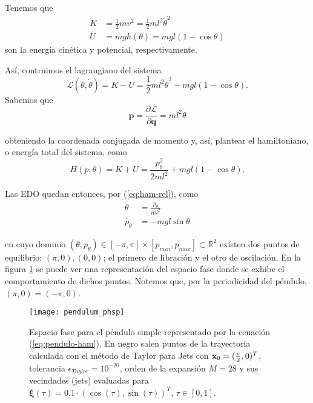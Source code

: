 Tenemos que 
\begin{align}
 K &= \frac{1}{2}m v^2 = \frac{1}{2} m l^2 \dot{\theta}^2 \nonumber \\
 U &= mgh(\theta) = mgl\left(1 - \cos{\theta} \right)
\end{align}
son la energía cinética y potencial, respectivamente. 

Así, contruimos el lagrangiano del sistema
\begin{equation*}
 \mathcal{L}(\theta,\dot{\theta}) = K - U = \frac{1}{2} m l^2 \dot{\theta}^2 - mgl\left(1 - \cos{\theta} \right).
\end{equation*}
Sabemos que
\begin{equation*}
 \mathbf{p} = \frac{\partial \mathcal{L}}{\partial \mathbf{\dot{q}}} = ml^2\dot{\theta}
\end{equation*}

obteniendo la coordenada conjugada de momento y, así, plantear el hamiltoniano, o energía total del sistema, como
\begin{equation}
 H(p,\theta) = K + U = \frac{p_{\theta}^2}{2ml^2} + mgl\left(1 - \cos{\theta} \right).
\label{eq:pendulo-ham}
\end{equation}
 
Las EDO quedan entonces, por (\ref{eq:ham-rel}), como
\begin{align}
 \dot{\theta} &= \frac{p_{\theta}}{ml^2} \nonumber \\
 \dot{p_{\theta}} &= -mgl\sin{\theta} 
\label{eq:pendulo-ode}
\end{align}

en cuyo dominio $(\theta,p_{\theta}) \in [-\pi,\pi]\times[p_{min},p_{max}] \subset \mathbb{R}^2$ existen dos puntos de equilibrio: $(\pi,0), (0,0)$; el primero de libración y el otro de oscilación. En la figura \ref{fig:pendulum_pshp} se puede ver una representación del espacio fase donde se exhibe el comportamiento de dichos puntos. Notemos que, por la periodicidad del péndulo, $(\pi, 0) = (-\pi, 0)$.

\begin{figure}[h!]
 \centering
 \texttt{[image: pendulum\_phsp]}
 \caption{Espacio fase para el péndulo simple representado por la ecuación (\ref{eq:pendulo-ham}). En negro salen puntos de la trayectoria calculada con el método de Taylor para Jets con $\mathbf{x}_0 = (\frac{\pi}{2},0)^T$, tolerancia $\epsilon_{Taylor} = 10^{-20}$, orden de la expansión $M = 28$ y sus vecindades (jets) evaluadas para $\mathbf{\xi}(\tau) = 0.1\cdot \left( \cos(\tau), \sin(\tau) \right)^T$, $\tau \in [0,1]$.}
\label{fig:pendulum_pshp}
\end{figure}

